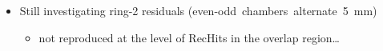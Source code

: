 \documentclass[compress]{beamer}
\begin{document}
\begin{frame}
\begin{columns}
\end{columns}

\begin{itemize}
\item Still investigating ring-2 residuals \mbox{(even-odd chambers alternate 5~mm)\hspace{-1 cm}}
\begin{itemize}
\item not reproduced at the level of RecHits in the overlap region\ldots
\end{itemize}
\end{itemize}
\end{frame}
\end{document}
